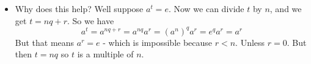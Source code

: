 \documentclass[12pt]{article}
\theoremstyle{plain}
\theoremstyle{definition}
\theoremstyle{remark}
\DeclareMathOperator{\ord}{ord}
\begin{document}
\begin{itemize}
 \item Why does this help?  Well suppose $a^t = e$.  Now we can divide $t$ by $n$, and we get $t = nq + r$.  So we have
 \[a^t = a^{nq+r} = a^{nq}a^r = (a^n)^qa^r = e^q a^r = a^r\]
 But that means $a^r = e$ - which is impossible because $r < n$.  Unless $r = 0$.  But then $t = nq$ so $t$ is a multiple of $n$.



\end{itemize}








\end{document}
